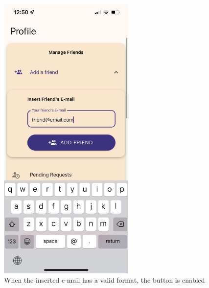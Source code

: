 \documentclass[11pt]{article}
\begin{document}
\begin{figure}[h!]
\begin{minipage}[c]{0.45\textwidth}
        \includegraphics[width=0.6\textwidth, clip]{../../assets/smartphone/profileAddEmail.PNG}
        \caption{When the inserted e-mail has a valid format, the button is enabled}
        \label{fig:profileAddEmail}
    \end{minipage}
\end{figure}
\end{document}
